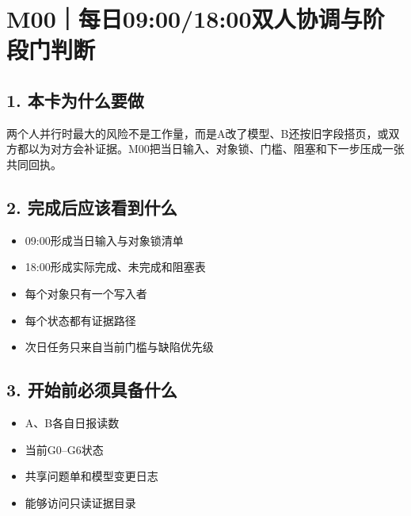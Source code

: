 \documentclass[UTF8,openany,zihao=-4]{ctexbook}
\renewcommand{\_}{\textunderscore\allowbreak}
\begin{document}
\section{M00｜每日09:00/18:00双人协调与阶段门判断}
\subsection*{1. 本卡为什么要做}
两个人并行时最大的风险不是工作量，而是A改了模型、B还按旧字段搭页，或双方都以为对方会补证据。M00把当日输入、对象锁、门槛、阻塞和下一步压成一张共同回执。


\subsection*{2. 完成后应该看到什么}
\begin{itemize}
\item 09:00形成当日输入与对象锁清单
\item 18:00形成实际完成、未完成和阻塞表
\item 每个对象只有一个写入者
\item 每个状态都有证据路径
\item 次日任务只来自当前门槛与缺陷优先级
\end{itemize}

\subsection*{3. 开始前必须具备什么}
\begin{itemize}[label=$\square$]
\item A、B各自日报读数
\item 当前G0--G6状态
\item 共享问题单和模型变更日志
\item 能够访问只读证据目录
\end{itemize}
\end{document}
